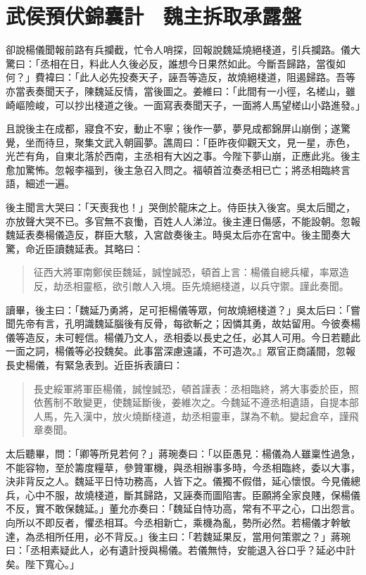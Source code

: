 
\chapter{武侯預伏錦囊計　魏主拆取承露盤}

卻說楊儀聞報前路有兵攔截，忙令人哨探，回報說魏延燒絕棧道，引兵攔路。儀大驚曰：「丞相在日，料此人久後必反，誰想今日果然如此。今斷吾歸路，當復如何？」費褘曰：「此人必先投奏天子，誣吾等造反，故燒絕棧道，阻遏歸路。吾等亦當表奏聞天子，陳魏延反情，當後圖之。姜維曰：「此間有一小徑，名槎山，雖崎嶇險峻，可以抄出棧道之後。一面寫表奏聞天子，一面將人馬望槎山小路進發。」

且說後主在成都，寢食不安，動止不寧；後作一夢，夢見成都錦屏山崩倒；遂驚覺，坐而待旦，聚集文武入朝圓夢。譙周曰：「臣昨夜仰觀天文，見一星，赤色，光芒有角，自東北落於西南，主丞相有大凶之事。今陛下夢山崩，正應此兆。後主愈加驚怖。忽報李福到，後主急召入問之。福頓首泣奏丞相已亡；將丞相臨終言語，細述一遍。

後主聞言大哭曰：「天喪我也！」哭倒於龍床之上。侍臣扶入後宮。吳太后聞之，亦放聲大哭不已。多官無不哀慟，百姓人人涕泣。後主連日傷感，不能設朝。忽報魏延表奏楊儀造反，群臣大駭，入宮啟奏後主。時吳太后亦在宮中。後主聞奏大驚，命近臣讀魏延表。其略曰：

\begin{quote}
征西大將軍南鄭侯臣魏延，誠惶誠恐，頓首上言：楊儀自總兵權，率眾造反，劫丞相靈柩，欲引敵人入境。臣先燒絕棧道，以兵守禦。謹此奏聞。
\end{quote}

讀畢，後主曰：「魏延乃勇將，足可拒楊儀等眾，何故燒絕棧道？」吳太后曰：「嘗聞先帝有言，孔明識魏延腦後有反骨，每欲斬之；因憐其勇，故姑留用。今彼奏楊儀等造反，未可輕信。楊儀乃文人，丞相委以長史之任，必其人可用。今日若聽此一面之詞，楊儀等必投魏矣。此事當深慮遠議，不可造次。』眾官正商議間，忽報長史楊儀，有緊急表到。近臣拆表讀曰：

\begin{quote}
長史綏軍將軍臣楊儀，誠惶誠恐，頓首謹表：丞相臨終，將大事委於臣，照依舊制不敢變更，使魏延斷後，姜維次之。今魏延不遵丞相遺語，自提本部人馬，先入漢中，放火燒斷棧道，劫丞相靈車，謀為不軌。變起倉卒，謹飛章奏聞。
\end{quote}

太后聽畢，問：「卿等所見若何？」蔣琬奏曰：「以臣愚見：楊儀為人雖稟性過急，不能容物，至於籌度糧草，參贊軍機，與丞相辦事多時，今丞相臨終，委以大事，決非背反之人。魏延平日恃功務高，人皆下之。儀獨不假借，延心懷恨。今見儀總兵，心中不服，故燒棧道，斷其歸路，又誣奏而圖陷害。臣願將全家良賤，保楊儀不反，實不敢保魏延。」董允亦奏曰：「魏延自恃功高，常有不平之心，口出怨言。向所以不即反者，懼丞相耳。今丞相新亡，乘機為亂，勢所必然。若楊儀才幹敏達，為丞相所任用，必不背反。」後主曰：「若魏延果反，當用何策禦之？」蔣琬曰：「丞相素疑此人，必有遺計授與楊儀。若儀無恃，安能退入谷口乎？延必中計矣。陛下寬心。」

